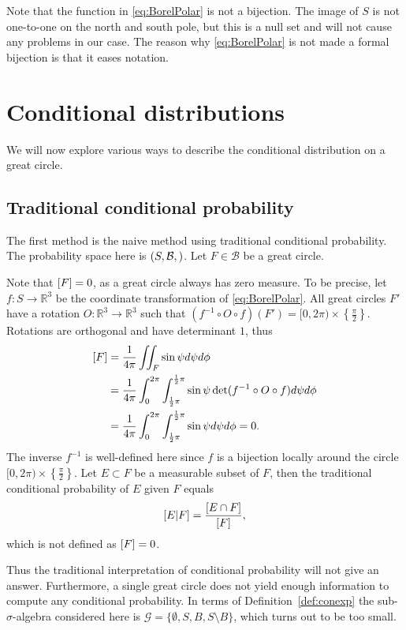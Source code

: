 \documentclass[a4paper]{report}
\theoremstyle{plain}
\theoremstyle{definition}
\theoremstyle{remark}
\numberwithin{equation}{chapter}
\newcommand{\R}{\mathbb{R}}
\let\P\relax
\DeclareMathOperator{\P}{\mathbb{P}}
\DeclareMathOperator{\1}{\mathbbm{1}}
\renewcommand{\G}{\mathcal{G}}
\newcommand{\B}{\mathcal{B}}
\begin{document}
Note that the function in \eqref{eq:BorelPolar} is not a bijection. The image of $S$ is not one-to-one on the north and south pole, but this is a null set and will not cause any problems in our case. The reason why \eqref{eq:BorelPolar} is not made a formal bijection is that it eases notation.

\section{Conditional distributions}
We will now explore various ways to describe the conditional distribution on a great circle.
\subsection{Traditional conditional probability}\label{sec:BorelNaive}
The first method is the naive method using traditional conditional probability. The probability space here is $(S,\B,\P)$. Let $F\in\B$ be a great circle.

Note that $\P[F]=0$, as a great circle always has zero measure. To be precise, let $f\colon S\to\R^3$ be the coordinate transformation of \eqref{eq:BorelPolar}. All great circles $F'$ have a rotation $O\colon\R^3\to\R^3$ such that $(f^{-1}\circ O\circ f)(F')=[0,2\pi)\times\left\{\frac{\pi}{2}\right\}$. Rotations are orthogonal and have determinant $1$, thus
\begin{align}
\P[F]&=\frac{1}{4\pi}\iint_F\sin\psi d\psi d\phi\\
&=\frac{1}{4\pi}\int_0^{2\pi}\int_{\frac{1}{2}\pi}^{\frac{1}{2}\pi}\sin\psi \det(f^{-1}\circ O\circ f)d\psi d\phi\\
&=\frac{1}{4\pi}\int_0^{2\pi}\int_{\frac{1}{2}\pi}^{\frac{1}{2}\pi}\sin\psi d\psi d\phi=0.
\end{align}
The inverse $f^{-1}$ is well-defined here since $f$ is a bijection locally around the circle $[0,2\pi)\times\left\{\frac{\pi}{2}\right\}$. Let $E\subset F$ be a measurable subset of $F$, then the traditional conditional probability of $E$ given $F$ equals
\begin{equation}
\P[E|F]=\frac{\P[E\cap F]}{\P[F]},
\end{equation}
which is not defined as $\P[F]=0$.

Thus the traditional interpretation of conditional probability will not give an answer. Furthermore, a single great circle does not yield enough information to compute any conditional probability. In terms of Definition~\ref{def:conexp} the sub-$\sigma$-algebra considered here is $\G=\{\emptyset,S,B,S\setminus B\}$, which turns out to be too small.
\end{document}
